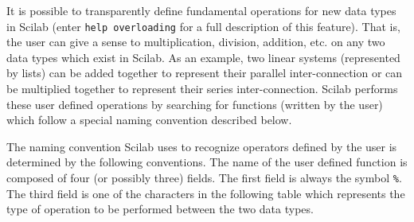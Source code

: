 	It is possible to transparently define fundamental operations 
for new data types in Scilab (enter {\tt help overloading} for 
a full description of this feature).
That is, the user can give a sense to multiplication, division, addition, etc.
on any two data types which exist in Scilab.  As an example, two linear
systems (represented by lists)
can be added together to represent their parallel inter-connection
or can be multiplied together to represent their series inter-connection.
Scilab performs these user defined operations by searching for functions
(written by the user) which follow a special naming convention described
below.

	The naming convention Scilab uses to recognize operators 
defined by the user is determined by the following conventions.  The name
of the user defined function is composed of four (or possibly three)
fields.  The first field is always the symbol {\tt \%}.  
The third field is one of the characters in the following table
which represents the type of operation to be performed between the
two data types.

